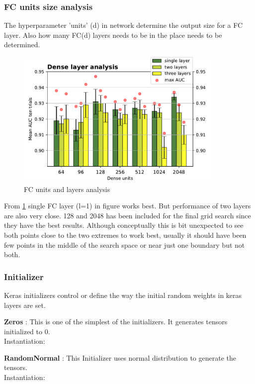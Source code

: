 \subsubsection{FC units size analysis} 
The hyperparameter 'units' (d) in network determine the output size for a FC layer. Also how many FC(d) layers needs to be in the place needs to be determined.
\begin{figure}[ht]
\centering
\includegraphics[width= 10cm]{images/contrastive/contrastive_loss_dense_bar}
\caption{FC units and layers analysis}
\label{fig:contrastive_loss_dense_bar}
\end{figure}

From \ref{fig:contrastive_loss_dense_bar} single FC layer (l=1) in figure works best. But performance of two layers are also very close.
128 and 2048 has been included for the final grid search since they have the best results. Although conceptually this is bit unexpected to see both points close to the two extremes to work best, usually it should have been few points 
in the middle of the search space or near just one boundary but not both. %

\subsubsection{Initializer}
Keras initializers\cite{kerasinit} control or define the way the initial random weights in keras layers are set.

\textbf{Zeros} : This is one of the simplest of the initializers. It generates tensors initialized to 0.\\
Instantiation: 

\textbf{RandomNormal} : This Initializer uses normal distribution to generate the tensors.\\
Instantiation: \\


